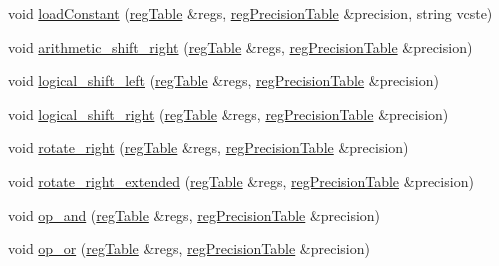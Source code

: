 \begin{DoxyCompactItemize}
\item 
void \hyperlink{classDAAInstruction_add9aa31194d56406bd69063a440aef87}{load\+Constant} (\hyperlink{DAAInstruction_8h_af0fae93a861de9cf37988d5673cac523}{reg\+Table} \&regs, \hyperlink{DAAInstruction_8h_a0e8cae02815a5f8adc750122d790b455}{reg\+Precision\+Table} \&precision, string vcste)
\item 
void \hyperlink{classDAAInstruction_aabf28b332cc945a681e3e83492947b7f}{arithmetic\+\_\+shift\+\_\+right} (\hyperlink{DAAInstruction_8h_af0fae93a861de9cf37988d5673cac523}{reg\+Table} \&regs, \hyperlink{DAAInstruction_8h_a0e8cae02815a5f8adc750122d790b455}{reg\+Precision\+Table} \&precision)
\item 
void \hyperlink{classDAAInstruction_a72e52e2c935ee6ab3d494973a5142ebd}{logical\+\_\+shift\+\_\+left} (\hyperlink{DAAInstruction_8h_af0fae93a861de9cf37988d5673cac523}{reg\+Table} \&regs, \hyperlink{DAAInstruction_8h_a0e8cae02815a5f8adc750122d790b455}{reg\+Precision\+Table} \&precision)
\item 
void \hyperlink{classDAAInstruction_a8b488a5cdf1e29c351abdc29cfe5d6a3}{logical\+\_\+shift\+\_\+right} (\hyperlink{DAAInstruction_8h_af0fae93a861de9cf37988d5673cac523}{reg\+Table} \&regs, \hyperlink{DAAInstruction_8h_a0e8cae02815a5f8adc750122d790b455}{reg\+Precision\+Table} \&precision)
\item 
void \hyperlink{classDAAInstruction_ac58387921102a26711f0ea67950d071d}{rotate\+\_\+right} (\hyperlink{DAAInstruction_8h_af0fae93a861de9cf37988d5673cac523}{reg\+Table} \&regs, \hyperlink{DAAInstruction_8h_a0e8cae02815a5f8adc750122d790b455}{reg\+Precision\+Table} \&precision)
\item 
void \hyperlink{classDAAInstruction_a68127dd0fdad592f7d1918e851f08c36}{rotate\+\_\+right\+\_\+extended} (\hyperlink{DAAInstruction_8h_af0fae93a861de9cf37988d5673cac523}{reg\+Table} \&regs, \hyperlink{DAAInstruction_8h_a0e8cae02815a5f8adc750122d790b455}{reg\+Precision\+Table} \&precision)
\item 
void \hyperlink{classDAAInstruction_a2d1231a596ba8600708564d705453f8f}{op\+\_\+and} (\hyperlink{DAAInstruction_8h_af0fae93a861de9cf37988d5673cac523}{reg\+Table} \&regs, \hyperlink{DAAInstruction_8h_a0e8cae02815a5f8adc750122d790b455}{reg\+Precision\+Table} \&precision)
\item 
void \hyperlink{classDAAInstruction_a80e4ca4fa44a2eeb2531f5084e0cab3e}{op\+\_\+or} (\hyperlink{DAAInstruction_8h_af0fae93a861de9cf37988d5673cac523}{reg\+Table} \&regs, \hyperlink{DAAInstruction_8h_a0e8cae02815a5f8adc750122d790b455}{reg\+Precision\+Table} \&precision)

\end{DoxyCompactItemize}
